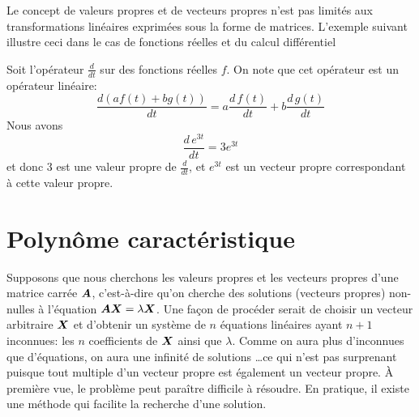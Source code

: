 Le concept de valeurs propres et de vecteurs propres n'est pas limités aux transformations
linéaires exprimées sous la forme de matrices.  L'exemple suivant illustre ceci dans
le cas de fonctions réelles et du calcul différentiel

\begin{exemple}
Soit l'opérateur $\displaystyle \frac{d}{dt}$ sur des fonctions réelles $f$. On note que cet opérateur est un opérateur linéaire:
\[
\frac{d (af(t) + bg(t))}{dt} = a \frac{d\,f(t)}{dt} + b\frac{d\, g(t)}{dt}
\]
Nous avons
\[
\frac{d\, e^{3t}}{dt} = 3 e^{3t}
\]
et donc 3 est une valeur propre de $\displaystyle \frac{d}{dt}$, et $e^{3t}$ est un vecteur propre correspondant à cette valeur propre.
\end{exemple}

\section{Polynôme caractéristique}
Supposons que nous cherchons les valeurs propres et les vecteurs propres d'une matrice carrée $\boldsymbol{A}$, c'est-à-dire qu'on
cherche des solutions (vecteurs propres) non-nulles à l'équation $\boldsymbol{A}\boldsymbol{X} = \lambda\boldsymbol{X}$.   Une façon de procéder serait
de choisir un vecteur arbitraire $\boldsymbol{X}$ et d'obtenir un système de $n$ équations linéaires ayant $n+1$ inconnues: les $n$ coefficients
de $\boldsymbol{X}$ ainsi que $\lambda$. Comme on aura plus d'inconnues que d'équations, on aura une infinité de solutions \ldots ce qui n'est 
pas surprenant puisque tout multiple d'un vecteur propre est également un vecteur propre.  À première vue, le problème peut paraître difficile
à résoudre.  En pratique, il existe une méthode qui facilite la recherche d'une solution.

